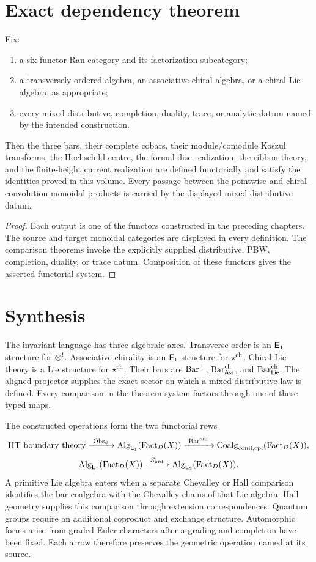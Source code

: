 \chapter{Exact dependency theorem}
\begin{theorem}
Fix:
\begin{enumerate}
\item a six-functor Ran category and its factorization subcategory;
\item a transversely ordered algebra, an associative chiral algebra, or a chiral Lie algebra, as appropriate;
\item every mixed distributive, completion, duality, trace, or analytic datum named by the intended construction.
\end{enumerate}
Then the three bars, their complete cobars, their module/comodule Koszul transforms, the Hochschild centre, the formal-disc realization, the ribbon theory, and the finite-height current realization are defined functorially and satisfy the identities proved in this volume.  Every passage between the pointwise and chiral-convolution monoidal products is carried by the displayed mixed distributive datum.
\end{theorem}
\begin{proof}
Each output is one of the functors constructed in the preceding chapters.  The source and target monoidal categories are displayed in every definition.  The comparison theorems invoke the explicitly supplied distributive, PBW, completion, duality, or trace datum.  Composition of these functors gives the asserted functorial system.
\end{proof}

\chapter{Synthesis}
The invariant language has three algebraic axes.  Transverse order is an $\mathsf E_1$ structure for $\otimes^!$.  Associative chirality is an $\mathsf E_1$ structure for $\mathbin{\star^{\mathrm{ch}}}$.  Chiral Lie theory is a Lie structure for $\mathbin{\star^{\mathrm{ch}}}$.  Their bars are $\operatorname{Bar}^{\perp}$, $\operatorname{Bar}^{\mathrm{ch}}_{\mathsf{Ass}}$, and $\operatorname{Bar}^{\mathrm{ch}}_{\mathsf{Lie}}$.  The aligned projector supplies the exact sector on which a mixed distributive law is defined.  Every comparison in the theorem system factors through one of these typed maps.

The constructed operations form the two functorial rows
\[
 \text{HT boundary theory}
 \xrightarrow{\ \mathrm{Obs}_{\partial}\ }
 \operatorname{Alg}_{\mathsf E_1}(\operatorname{Fact}_D(X))
 \xrightarrow{\ \operatorname{Bar}^{\mathrm{ord}}\ }
 \operatorname{Coalg}_{\mathrm{conil,cpl}}(\operatorname{Fact}_D(X)),
\]
\[
 \operatorname{Alg}_{\mathsf E_1}(\operatorname{Fact}_D(X))
 \xrightarrow{\ Z_{\mathrm{ord}}\ }
 \operatorname{Alg}_{\mathsf E_2}(\operatorname{Fact}_D(X)).
\]
A primitive Lie algebra enters when a separate Chevalley or Hall comparison identifies the bar coalgebra with the Chevalley chains of that Lie algebra. Hall geometry supplies this comparison through extension correspondences. Quantum groups require an additional coproduct and exchange structure. Automorphic forms arise from graded Euler characters after a grading and completion have been fixed. Each arrow therefore preserves the geometric operation named at its source.

